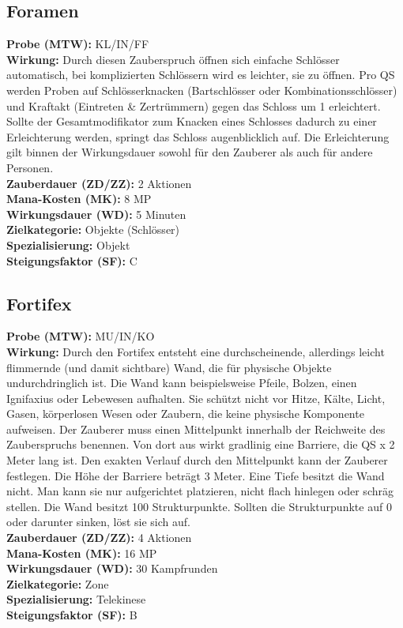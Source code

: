 \subsection{Foramen}
\label{chap:foramen}
\textbf{Probe (MTW):} KL/IN/FF \\
\textbf{Wirkung:} Durch diesen Zauberspruch öffnen sich einfache Schlösser automatisch, bei komplizierten Schlössern wird es leichter, sie zu öffnen. Pro QS werden Proben auf Schlösserknacken (Bartschlösser oder Kombinationsschlösser) und Kraftakt (Eintreten \& Zertrümmern) gegen das Schloss um 1 erleichtert. Sollte der Gesamtmodifikator zum Knacken eines Schlosses dadurch zu einer Erleichterung werden, springt das Schloss augenblicklich auf. Die Erleichterung gilt binnen der Wirkungsdauer sowohl für den Zauberer als auch für andere Personen. \\
\textbf{Zauberdauer (ZD/ZZ):} 2 Aktionen \\
\textbf{Mana-Kosten (MK):} 8 MP \\
\textbf{Wirkungsdauer (WD):} 5 Minuten \\
\textbf{Zielkategorie:} Objekte (Schlösser) \\
\textbf{Spezialisierung:} Objekt \\
\textbf{Steigungsfaktor (SF):} C


\subsection{Fortifex}
\label{chap:fortifex}
\textbf{Probe (MTW):} MU/IN/KO \\
\textbf{Wirkung:} Durch den Fortifex entsteht eine durchscheinende, allerdings leicht flimmernde (und damit sichtbare) Wand, die für physische Objekte undurchdringlich ist. Die Wand kann beispielsweise Pfeile, Bolzen, einen Ignifaxius oder Lebewesen aufhalten. Sie schützt nicht vor Hitze, Kälte, Licht, Gasen, körperlosen Wesen oder Zaubern, die keine physische Komponente aufweisen. Der Zauberer muss einen Mittelpunkt innerhalb der Reichweite des Zauberspruchs benennen. Von dort aus wirkt gradlinig eine Barriere, die QS x 2 Meter lang ist. Den exakten Verlauf durch den Mittelpunkt kann der Zauberer festlegen. Die Höhe der Barriere beträgt 3 Meter. Eine Tiefe besitzt die Wand nicht. Man kann sie nur aufgerichtet platzieren, nicht flach hinlegen oder schräg stellen. Die Wand besitzt 100 Strukturpunkte. Sollten die Strukturpunkte auf 0 oder darunter sinken, löst sie sich auf. \\
\textbf{Zauberdauer (ZD/ZZ):} 4 Aktionen \\
\textbf{Mana-Kosten (MK):} 16 MP \\
\textbf{Wirkungsdauer (WD):} 30 Kampfrunden \\
\textbf{Zielkategorie:} Zone \\
\textbf{Spezialisierung:} Telekinese \\
\textbf{Steigungsfaktor (SF):} B


